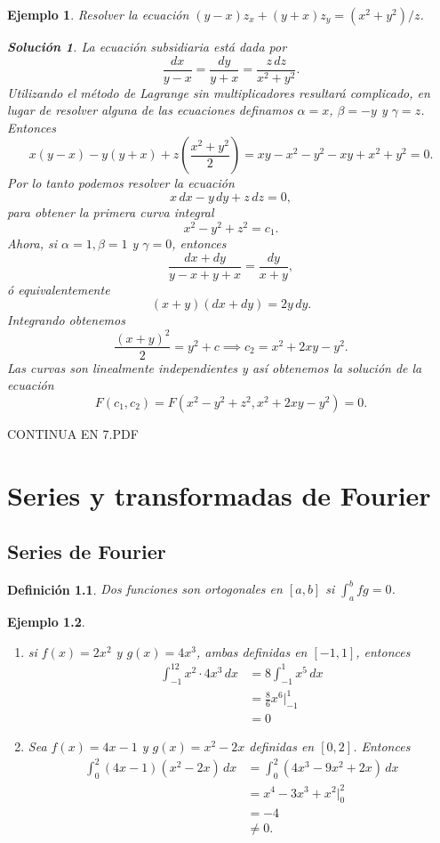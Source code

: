 \documentclass[11pt,letterpaper]{report}
\newtheorem{defn}{Definición}[chapter]
\newtheorem{example}[defn]{Ejemplo}
\newtheorem*{sol}{Solución}
\newcommand\<{\langle}
\renewcommand\>{\rangle}
\begin{document}
\begin{example}
  Resolver la ecuación $(y-x) z_x + (y+x) z_y = (x^2+y^2) /
  z$.
  \begin{sol}
    La ecuación subsidiaria está dada por
    \[
    \frac{dx}{y-x} = \frac{dy}{y+x} = \frac{z \,
    dz}{x^2+y^2}.
    \] 
    Utilizando el método de Lagrange sin multiplicadores
    resultará complicado, en lugar de resolver alguna de las
    ecuaciones definamos $\alpha = x$, $\beta = -y$ y
    $\gamma = z$. Entonces
    \[
    x(y-x) - y(y+x) + z\left(\frac{x^2+y^2}{2}\right) = xy -
    x^2 - y^2 - xy + x^2 + y^2 = 0.
    \]
    Por lo tanto podemos resolver la ecuación
    \[
    x \, dx - y \, dy + z \, dz = 0,
    \] 
    para obtener la primera curva integral
    \[
    x^2 - y^2 + z^2 = c_1.
    \] 
    Ahora, si $\alpha = 1, \beta = 1$ y $\gamma = 0$,
    entonces
    \[
    \frac{dx + dy}{y - x + y + x} = \frac{dy}{x + y},
    \] 
    ó equivalentemente
    \[
      (x+y)(dx + dy) = 2y \, dy.
    \] 
    Integrando obtenemos
    \[
    \frac{(x+y)^2}{2} = y^2 + c \implies c_2 = x^2 + 2xy -
    y^2.
    \] 
    Las curvas son linealmente independientes y así
    obtenemos la solución de la ecuación 
    \[
    F(c_1,c_2) = F\left(x^2 - y^2 +
      z^2, x^2 + 2xy - y^2\right) = 0.
    \] 
  \end{sol}
\end{example}

CONTINUA EN 7.PDF

\chapter{Series y transformadas de Fourier}

\section{Series de Fourier}

\begin{defn}
  Dos funciones son ortogonales en $[a,b]$ si $\int_a^bfg=0$.
\end{defn}
\begin{example}
  \begin{enumerate}
    \item si $f(x)=2x^2$ y $g(x)=4x^3$, ambas definidas en
    $[-1,1]$, entonces
    \begin{align*}
      \int_{-1}^12x^2\cdot 4x^3\,dx
      &= 8\int_{-1}^1x^5\,dx \\
      &= \frac{8}{6}x^6|_{-1}^1 \\
      &= 0
    \end{align*}
    \item Sea $f(x)=4x-1$ y $g(x)=x^2-2x$ definidas en $[0,2]$.
    Entonces
    \begin{align*}
      \int_0^2(4x-1)(x^2-2x)\,dx
      &= \int_0^2(4x^3-9x^2+2x)\,dx \\
      &= x^4-3x^3+x^2 |_0^2 \\
      &= -4 \\
      &\neq 0.
    \end{align*}
  \end{enumerate}
\end{example}
\end{document}
